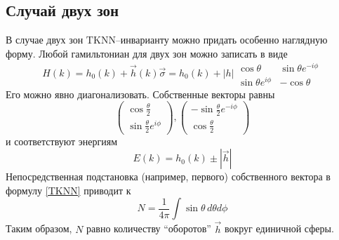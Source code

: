 \subsection{Случай двух зон}
В случае двух зон $\mathrm{TKNN}$--инварианту можно придать особенно наглядную 
форму. Любой гамильтониан для двух зон можно записать в виде
\begin{equation}
    H(k) = h_0(k) + \vec{h}(k)\vec{\sigma} = h_0(k) + |h|
            \begin{matrix}
                \cos{\theta} & \sin{\theta}e^{-i\phi} \\
                \sin{\theta}e^{i\phi} & -\cos{\theta}
            \end{matrix}
\end{equation}
Его можно явно диагонализовать. Собственные векторы равны
\begin{equation}
    \left(\begin{matrix}
        \cos{\frac{\theta}{2}} \\
        \sin{\frac{\theta}{2}}e^{i\phi}
    \end{matrix}\right),
    \left(\begin{matrix}
        -\sin{\frac{\theta}{2}}e^{-i\phi}\\
        \cos{\frac{\theta}{2}} 
    \end{matrix}\right)
\end{equation}
и соответствуют энергиям 
\begin{equation}
    E(k) = h_0(k) \pm |\vec{h}|
\end{equation}
Непосредственная подстановка (например, первого) собственного вектора в формулу \eqref{TKNN}
приводит к 
\begin{equation}
    N = \frac{1}{4\pi} \int \sin{\theta}\,d\theta d\phi
\end{equation}
Таким образом, $N$ равно количеству ``оборотов'' $\vec{h}$ вокруг единичной сферы.
